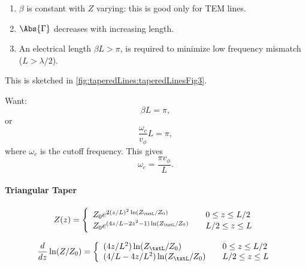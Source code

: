 \begin{enumerate}
\item \( \beta \) is constant with \( Z \) varying: this is good only for TEM lines.
\item \( \Abs{\Gamma} \) decreases with increasing length.
\item An electrical length \( \beta L > \pi \), is required to minimize low frequency mismatch (\( L > \lambda/2\)).
\end{enumerate}

This is sketched in \cref{fig:taperedLines:taperedLinesFig3}.

Want:
\begin{equation}\label{eqn:continuumAndOtherTransformersCore:760}
\beta L = \pi,
\end{equation}
or
\begin{equation}\label{eqn:continuumAndOtherTransformersCore:780}
\frac{\omega_c}{v_\phi} L = \pi,
\end{equation}
where \( \omega_c \) is the cutoff frequency.  This gives
\begin{equation}\label{eqn:continuumAndOtherTransformersCore:800}
\omega_c = \frac{\pi v_\phi}{L}.
\end{equation}
\paragraph{Triangular Taper}
\begin{equation}\label{eqn:continuumAndOtherTransformersCore:960}
Z(z) =
\left\{
\begin{array}{l l}
Z_0 e^{2(z/L)^2 \ln(Z_\txtL/Z_0)} & \quad \mbox{\( 0 \le z \le L/2\)} \\
Z_0 e^{(4z/L - 2 z^2 - 1) \ln(Z_\txtL/Z_0)} & \quad \mbox{\( L/2 \le z \le L\)} \\
\end{array}
\right.
\end{equation}

\begin{equation}\label{eqn:continuumAndOtherTransformersCore:980}
\frac{d}{dz} \ln (Z/Z_0) =
\left\{
\begin{array}{l l}
{(4z/L^2) \ln(Z_\txtL/Z_0)} & \quad \mbox{\( 0 \le z \le L/2\)} \\
{(4/L - 4z/L^2) \ln(Z_\txtL/Z_0)} & \quad \mbox{\( L/2 \le z \le L\)} \\
\end{array}
\right.
\end{equation}

